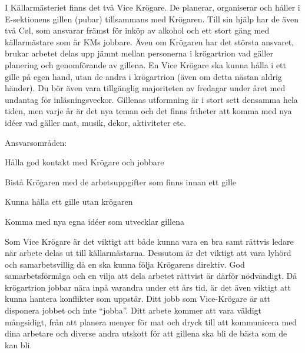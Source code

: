 \documentclass[10pt]{article}
\def\post{Vice Krögare}
\def\doctitle{Kravprofil för \post}
\begin{document}
\heading{\doctitle}

I Källarmästeriet finns det två Vice Krögare. De planerar, organiserar och håller i E-sektionens gillen (pubar) tillsammans med Krögaren. Till sin hjälp har de även två Cøl, som ansvarar främst för inköp av alkohol och ett stort gäng med källarmästare som är KMs jobbare. Även om Krögaren har det största ansvaret, brukar arbetet delas upp jämnt mellan personerna i krögartrion vad gäller planering och genomförande av gillena. En Vice Krögare ska kunna hålla i ett gille på egen hand, utan de andra i krögartrion (även om detta nästan aldrig händer). Du bör även vara tillgänglig majoriteten av fredagar under året med undantag för inläsningsveckor. Gillenas utformning är i stort sett densamma hela tiden, men varje år är det nya teman och det finns friheter att komma med nya idéer vad gäller mat, musik, dekor, aktiviteter etc.  

Ansvarsområden:
\begin{dashlist}
    \item Hålla god kontakt med Krögare och jobbare
    \item Bistå Krögaren med de arbetsuppgifter som finns innan ett gille
    \item Kunna hålla ett gille utan krögaren
    \item Komma med nya egna idéer som utvecklar gillena
\end{dashlist}

Som Vice Krögare är det viktigt att både kunna vara en bra samt rättvis ledare när arbete delas ut till källarmästarna. Dessutom är det viktigt att vara lyhörd och samarbetsvillig då en ska kunna följa Krögarens direktiv. God samarbetsförmåga och en vilja att dela arbetet rättvist är därför nödvändigt. Då krögartrion jobbar nära inpå varandra under ett års tid, är det även viktigt att kunna hantera konflikter som uppstår. Ditt jobb som Vice-Krögare är att disponera jobbet och inte “jobba”. Ditt arbete kommer att vara väldigt mångsidigt, från att planera menyer för mat och dryck till att kommunicera med dina arbetare och diverse andra utskott för att gillena ska bli de bästa som de kan bli. 
\end{document}
